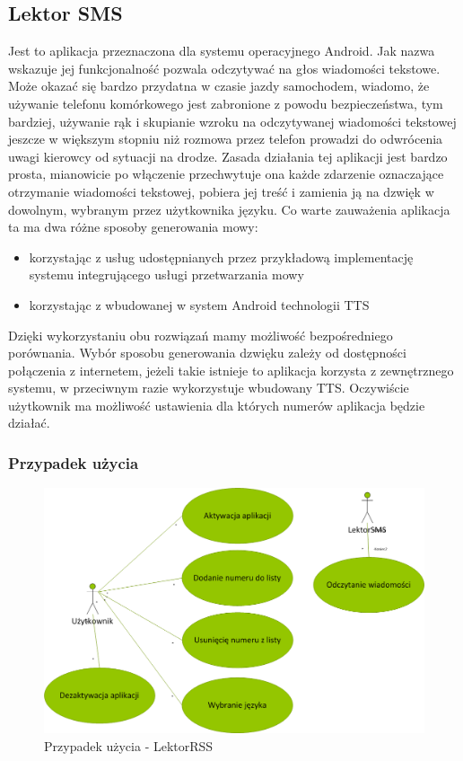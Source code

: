 \subsection{Lektor SMS}
Jest to aplikacja przeznaczona dla systemu operacyjnego Android. Jak nazwa wskazuje jej funkcjonalność pozwala odczytywać na głos wiadomości tekstowe. Może okazać się bardzo przydatna w czasie jazdy samochodem, wiadomo, że używanie telefonu komórkowego jest zabronione z powodu bezpieczeństwa, tym bardziej, używanie rąk i skupianie wzroku na odczytywanej wiadomości tekstowej jeszcze w większym stopniu niż rozmowa przez telefon prowadzi do odwrócenia uwagi kierowcy od sytuacji na drodze.
Zasada działania tej aplikacji jest bardzo prosta, mianowicie po włączenie przechwytuje ona każde zdarzenie oznaczające otrzymanie wiadomości tekstowej, pobiera jej treść i zamienia ją na dzwięk w dowolnym, wybranym przez użytkownika języku. Co warte zauważenia aplikacja ta ma dwa różne sposoby generowania mowy:
\begin{itemize}
	\item korzystając z usług udostępnianych przez przykładową implementację systemu integrującego usługi przetwarzania mowy
	\item korzystając z wbudowanej w system Android technologii TTS
\end{itemize} 
Dzięki wykorzystaniu obu rozwiązań mamy możliwość bezpośredniego porównania. Wybór sposobu generowania dzwięku zależy od dostępności połączenia z internetem, jeżeli takie istnieje to aplikacja korzysta z zewnętrznego systemu, w przeciwnym razie wykorzystuje wbudowany TTS. Oczywiście użytkownik ma możliwość ustawienia dla których numerów aplikacja będzie działać.
\newpage
\subsubsection{Przypadek użycia}
\begin{figure}[!h]
	\centering
	\includegraphics[scale=0.45]{useCaseLektorSMS.png} 
	\caption{Przypadek użycia - LektorRSS}
\end{figure}

